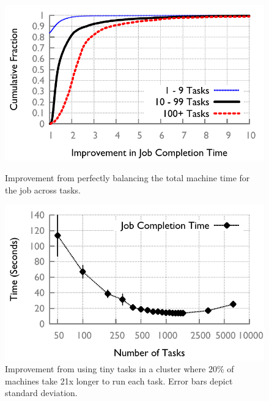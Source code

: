 \begin{figure}[!ht]
  \centering
  \vspace{-0.2in}
  \begin{minipage}[t]{0.45\textwidth}
    \includegraphics[width=\textwidth]{figures/binpacked1-sep}
    \vspace{-4ex}
    \caption{ Improvement from perfectly balancing the total machine time for the job across tasks. }
    \label{fig:binpacked}
  \end{minipage}
  \hspace{1.2em}
  \begin{minipage}[t]{0.45\textwidth}
    \includegraphics[width=\textwidth]{figures/spark-skew-results}
    \vspace{-4ex}
    \caption{Improvement from using tiny tasks in a cluster where 20\% of machines
take 21x longer to run each task. Error bars depict standard deviation.}
    \label{fig:sparkskew}
  \end{minipage}
  \hspace{.5em}
\end{figure}
